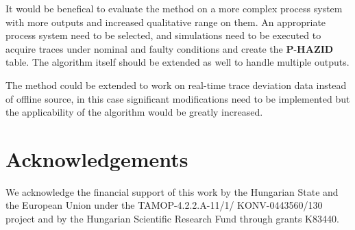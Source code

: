 \documentclass[conference]{IEEEtran}
\begin{document}
It would be benefical to evaluate the method on a more complex process system with more outputs and increased qualitative range on them. An appropriate process system need to be selected, and simulations need to be executed to acquire traces under nominal and faulty conditions and create the $\textbf{P-HAZID}$ table. The algorithm itself should be extended as well to handle multiple outputs.

The method could be extended to work on real-time trace deviation data instead of offline source, in this case significant modifications need to be implemented but the applicability of the algorithm would be greatly increased.

\section{Acknowledgements} 
We acknowledge the financial support of this work by the Hungarian State
and the European Union under the TAMOP-4.2.2.A-11/1/ KONV-0443560/130
project and by the Hungarian Scientific Research Fund through
grants K83440.


\end{document}
